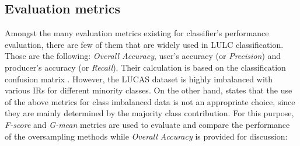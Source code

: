 \documentclass[remotesensing,article,submit,moreauthors,pdftex]{Definitions/mdpi}
\begin{document}

\subsection{Evaluation metrics}

Amongst the many evaluation metrics existing for classifier's performance
evaluation, there are few of them that are widely used in LULC classification.
Those are the following: \textit{Overall Accuracy}, user's accuracy (or
\textit{Precision}) and producer's accuracy (or \textit{Recall}). Their
calculation is based on the classification confusion matrix \cite{Liu2007}.
However, the LUCAS dataset is highly imbalanced with various IRs for different
minority classes. On the other hand, \cite{He2009} states that the use of the
above metrics for class imbalanced data is not an appropriate choice, since they
are mainly determined by the majority class contribution. For this purpose,
\textit{F-score} and \textit{G-mean} metrics are used to evaluate and compare
the performance of the oversampling methods while \textit{Overall Accuracy} is
provided for discussion:
\end{document}
